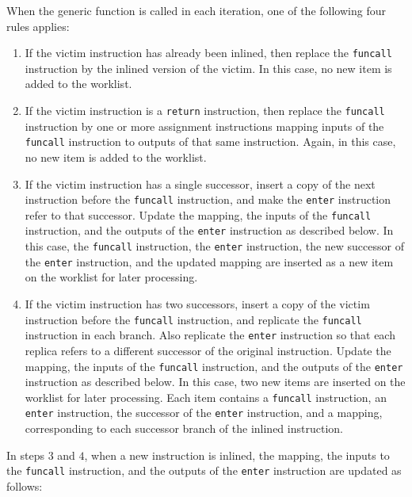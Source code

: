 When the generic function is called in each iteration, one of the
following four rules applies:

\begin{enumerate}
\item If the victim instruction has already been inlined, then replace
  the \texttt{funcall} instruction by the inlined version of the
  victim.  In this case, no new item is added to the worklist.
\item If the victim instruction is a \texttt{return} instruction, then
  replace the \texttt{funcall} instruction by one or more assignment
  instructions mapping inputs of the \texttt{funcall} instruction to
  outputs of that same instruction.  Again, in this case, no new item
  is added to the worklist.
\item If the victim instruction has a single successor, insert a copy of
  the next instruction before the \texttt{funcall} instruction, and
  make the \texttt{enter} instruction refer to that successor.  Update
  the mapping, the inputs of the \texttt{funcall} instruction, and the
  outputs of the \texttt{enter} instruction as described below.  In
  this case, the \texttt{funcall} instruction, the \texttt{enter}
  instruction, the new successor of the \texttt{enter} instruction,
  and the updated mapping are inserted as a new item on the worklist
  for later processing.
\item If the victim instruction has two successors, insert a copy of
  the victim instruction before the \texttt{funcall} instruction, and
  replicate the \texttt{funcall} instruction in each branch.  Also
  replicate the \texttt{enter} instruction so that each replica refers
  to a different successor of the original instruction.  Update the
  mapping, the inputs of the \texttt{funcall} instruction, and the
  outputs of the \texttt{enter} instruction as described below.  In
  this case, two new items are inserted on the worklist for later
  processing.  Each item contains a \texttt{funcall} instruction, an
  \texttt{enter} instruction, the successor of the \texttt{enter}
  instruction, and a mapping, corresponding to each successor branch
  of the inlined instruction.
\end{enumerate}

In steps $3$ and $4$, when a new instruction is inlined, the mapping,
the inputs to the \texttt{funcall} instruction, and the outputs of the
\texttt{enter} instruction are updated as follows:

